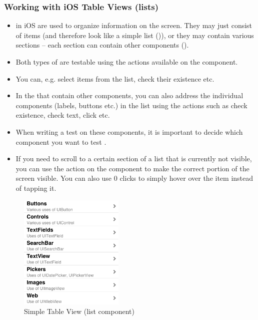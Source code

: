 \subsubsection{Working with iOS Table Views (lists)}
\begin{itemize}
\item {} in iOS are used to organize information on the screen. They may just consist of items (and therefore look like a simple list ()), or they may contain various sections -- each section can contain other components (). 
\item Both types of  are testable using the actions available on the  component. 
\item You can, e.g. select items from the list, check their existence etc.
\item In the  that contain other components, you can also address the individual components (labels, buttons etc.) in the list using the actions such as check existence, check text, click etc. 
\item When writing a test on these components, it is important to decide which component you want to test .
\item If you need to scroll to a certain section of a list that is currently not visible, you can use the  action on the  component to make the correct portion of the screen visible. You can also use 0 clicks to simply hover over the item instead of tapping it.
\end{itemize}

\begin{figure}[h]
\begin{center}
\includegraphics[width=5cm]{Toolkit/iOS/PS/TableViewSimple}
\caption{Simple Table View (list component)}
\label{TableViewSimple}
\end{center}
\end{figure}

